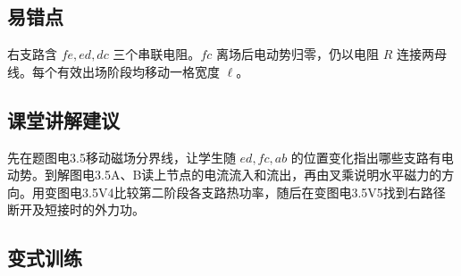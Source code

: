 \documentclass[UTF8,fontset=fandol,a4paper,11pt]{ctexart}
\begin{document}


\subsection*{易错点}

右支路含 $fe,ed,dc$ 三个串联电阻。$fc$ 离场后电动势归零，仍以电阻 $R$ 连接两母线。每个有效出场阶段均移动一格宽度 $\ell$。



\subsection*{课堂讲解建议}

先在题图电3.5移动磁场分界线，让学生随 $ed,fc,ab$ 的位置变化指出哪些支路有电动势。到解图电3.5A、B读上节点的电流流入和流出，再由叉乘说明水平磁力的方向。用变图电3.5V4比较第二阶段各支路热功率，随后在变图电3.5V5找到右路径断开及短接时的外力功。


\subsection*{变式训练}
\end{document}
